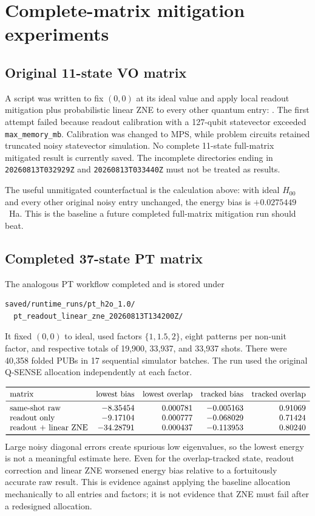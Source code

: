 \documentclass[11pt]{article}
\newcommand{\code}[1]{\texttt{#1}}
\begin{document}
\section{Complete-matrix mitigation experiments}

\subsection{Original 11-state VO matrix}

A script was written to fix $(0,0)$ at its ideal value and apply local readout
mitigation plus probabilistic linear ZNE to every other quantum entry:
.  The first attempt
failed because readout calibration with a 127-qubit statevector exceeded
\code{max\_memory\_mb}.  Calibration was changed to MPS, while problem
circuits retained truncated noisy statevector simulation.  No complete
11-state full-matrix mitigated result is currently saved.  The incomplete
directories ending in \code{20260813T032929Z} and
\code{20260813T033440Z} must not be treated as results.

The useful unmitigated counterfactual is the calculation above: with ideal
$H_{00}$ and every other original noisy entry unchanged, the energy bias is
$+0.0275449$~Ha.  This is the baseline a future completed full-matrix
mitigation run should beat.

\subsection{Completed 37-state PT matrix}

The analogous PT workflow completed and is stored under
\begin{verbatim}
saved/runtime_runs/pt_h2o_1.0/
  pt_readout_linear_zne_20260813T134200Z/
\end{verbatim}
It fixed $(0,0)$ to ideal, used factors $\{1,1.5,2\}$, eight patterns per
non-unit factor, and respective totals of 19,900, 33,937, and 33,937 shots.
There were 40,358 folded PUBs in 17 sequential simulator batches.  The run
used the original Q-SENSE allocation independently at each factor.

\[
\begin{array}{lrrrr}
\toprule
\text{matrix}&\text{lowest bias}&\text{lowest overlap}
 &\text{tracked bias}&\text{tracked overlap}\\
\midrule
\text{same-shot raw}&-8.35454&0.000781&-0.005163&0.91069\\
\text{readout only}&-9.17104&0.000777&-0.068029&0.71424\\
\text{readout + linear ZNE}&-34.28791&0.000437&-0.113953&0.80240\\
\bottomrule
\end{array}
\]
Large noisy diagonal errors create spurious low eigenvalues, so the lowest
energy is not a meaningful estimate here.  Even for the overlap-tracked
state, readout correction and linear ZNE worsened energy bias relative to a
fortuitously accurate raw result.  This is evidence against applying the
baseline allocation mechanically to all entries and factors; it is not
evidence that ZNE must fail after a redesigned allocation.
\end{document}
